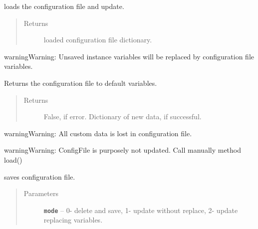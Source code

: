 \documentclass[letterpaper,10pt,english]{sphinxmanual}
\begin{document}
\begin{fulllineitems}

\begin{fulllineitems}
\label{RRtoolbox.lib:RRtoolbox.lib.config.DirectoryManager.load}
loads the configuration file and update.
\begin{quote}\begin{description}
\item[{Returns}] \leavevmode
loaded configuration file dictionary.

\end{description}\end{quote}

\begin{notice}{warning}{Warning:}
Unsaved instance variables will be replaced by configuration file variables.
\end{notice}

\end{fulllineitems}


\begin{fulllineitems}
\label{RRtoolbox.lib:RRtoolbox.lib.config.DirectoryManager.reset}
Returns the configuration file to default variables.
\begin{quote}\begin{description}
\item[{Returns}] \leavevmode
False, if error. Dictionary of new data, if successful.

\end{description}\end{quote}

\begin{notice}{warning}{Warning:}
All custom data is lost in configuration file.
\end{notice}

\begin{notice}{warning}{Warning:}
ConfigFile is purposely not updated. Call manually method load()
\end{notice}

\end{fulllineitems}


\begin{fulllineitems}
\label{RRtoolbox.lib:RRtoolbox.lib.config.DirectoryManager.save}
saves configuration file.
\begin{quote}\begin{description}
\item[{Parameters}] \leavevmode
\textbf{\texttt{mode}} -- 0- delete and save, 1- update without replace,
2- update replacing variables.


\end{description}
\end{quote}
\end{fulllineitems}
\end{fulllineitems}
\end{document}
